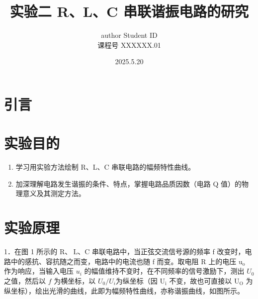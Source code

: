 \documentclass{article}
\title{\heiti\zihao{2}实验二 R、L、C 串联谐振电路的研究 }
\author{\songti  author  Student ID  \\
课程号  XXXXXX.01 }
\date{2025.5.20}
\begin{document}
    \maketitle
    
\begin{abstract}
    
\end{abstract}
\section{引言}

\section{实验目的}
\begin{enumerate}
    \item 学习用实验方法绘制 R、L、C 串联电路的幅频特性曲线。 
    \item 加深理解电路发生谐振的条件、特点，掌握电路品质因数（电路 Q 值）的物理意义及其测定方法。
\end{enumerate}

\section{实验原理}
1．在图 1 所示的 $\mathrm{R} 、 \mathrm{~L} 、 \mathrm{C}$ 串联电路中，当正弦交流信号源的频率 f 改变时，电路中的感抗、容抗随之而变，电路中的电流也随 f 而变。取电阻 R 上的电压 $\mathrm{u}_{\mathrm{o}}$ 作为响应，当输入电压 $u_i$ 的幅值维持不变时，在不同频率的信号激励下，测出 $U_0$ 之值，然后以 $f$ 为横坐标，以 $U_0 / U_i$为纵坐标（因 $\mathrm{U}_{\mathrm{i}}$ 不变，故也可直接以 $\mathrm{U}_{\mathrm{O}}$ 为纵坐标），绘出光滑的曲线，此即为幅频特性曲线，亦称谐振曲线，如图所示。
\end{document}
